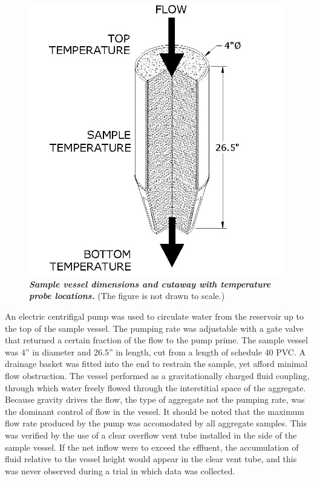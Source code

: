 \begin{figure}[h!]
\centering\includegraphics[scale=.35]{isoVessel.jpg}
\caption[Sample Vessel Cross Section]{\textbf{\emph{Sample vessel dimensions and cutaway with temperature probe locations.}} (The figure is not drawn to scale.)\label{isovessel}}
\end{figure}

An electric centrifigal pump was used to circulate water from the reservoir up to the top of the sample vessel. The pumping rate was adjustable with a gate valve that returned a certain fraction of the flow to the pump prime. The sample vessel was 4'' in diameter and 26.5'' in length, cut from a length of schedule 40 PVC. A drainage basket was fitted into the end to restrain the sample, yet afford minimal flow obstruction. The vessel performed as a gravitationally charged fluid coupling, through which water freely flowed through the interstitial space of the aggregate. Because gravity drives the flow, the type of aggregate not the pumping rate, was the dominant control of flow in the vessel. It should be noted that the maximum flow rate produced by the pump was accomodated by all aggregate samples. This was verified by the use of a clear overflow vent tube installed in the side of the sample vessel. If the net inflow were to exceed the effluent, the accumulation of fluid relative to the vessel height would appear in the clear vent tube, and this was never observed during a trial in which data was collected.

